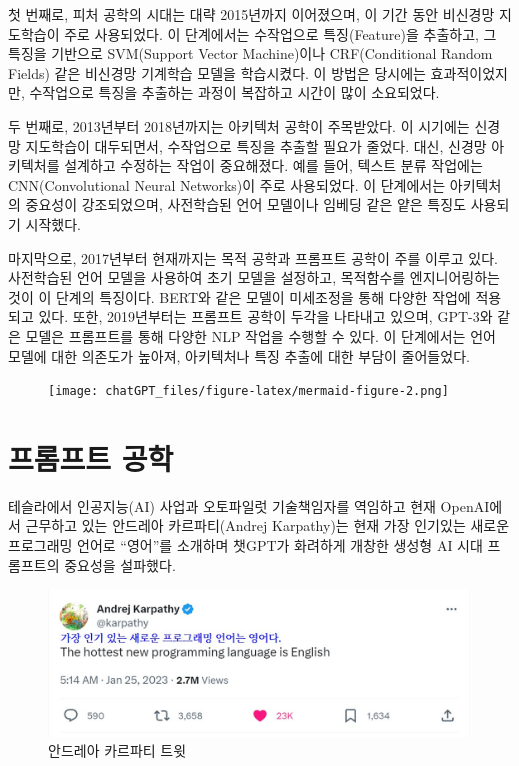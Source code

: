 \documentclass[
  letterpaper,
]{book}
\begin{document}
첫 번째로, 피처 공학의 시대는 대략 2015년까지 이어졌으며, 이 기간 동안
비신경망 지도학습이 주로 사용되었다. 이 단계에서는 수작업으로
특징(Feature)을 추출하고, 그 특징을 기반으로 SVM(Support Vector
Machine)이나 CRF(Conditional Random Fields) 같은 비신경망 기계학습
모델을 학습시켰다. 이 방법은 당시에는 효과적이었지만, 수작업으로 특징을
추출하는 과정이 복잡하고 시간이 많이 소요되었다.

두 번째로, 2013년부터 2018년까지는 아키텍처 공학이 주목받았다. 이
시기에는 신경망 지도학습이 대두되면서, 수작업으로 특징을 추출할 필요가
줄었다. 대신, 신경망 아키텍처를 설계하고 수정하는 작업이 중요해졌다.
예를 들어, 텍스트 분류 작업에는 CNN(Convolutional Neural Networks)이
주로 사용되었다. 이 단계에서는 아키텍처의 중요성이 강조되었으며,
사전학습된 언어 모델이나 임베딩 같은 얕은 특징도 사용되기 시작했다.

마지막으로, 2017년부터 현재까지는 목적 공학과 프롬프트 공학이 주를
이루고 있다. 사전학습된 언어 모델을 사용하여 초기 모델을 설정하고,
목적함수를 엔지니어링하는 것이 이 단계의 특징이다. BERT와 같은 모델이
미세조정을 통해 다양한 작업에 적용되고 있다. 또한, 2019년부터는 프롬프트
공학이 두각을 나타내고 있으며, GPT-3와 같은 모델은 프롬프트를 통해
다양한 NLP 작업을 수행할 수 있다. 이 단계에서는 언어 모델에 대한
의존도가 높아져, 아키텍처나 특징 추출에 대한 부담이 줄어들었다.
\autocite{Amatriain2023}

\begin{figure}[H]

{\centering \texttt{[image: chatGPT\_files/figure-latex/mermaid-figure-2.png]}

}

\end{figure}

\hypertarget{uxd504uxb86cuxd504uxd2b8-uxacf5uxd559}{%
\chapter{프롬프트 공학}\label{uxd504uxb86cuxd504uxd2b8-uxacf5uxd559}}

테슬라에서 인공지능(AI) 사업과 오토파일럿 기술책임자를 역임하고 현재
OpenAI에서 근무하고 있는 안드레아 카르파티(Andrej Karpathy)는 현재 가장
인기있는 새로운 프로그래밍 언어로 ``영어''를 소개하며 챗GPT가 화려하게
개창한 생성형 AI 시대 프롬프트의 중요성을 설파했다.

\begin{figure}

{\centering \includegraphics[width=10.45833in,height=\textheight]{images/andrej.jpg}

}

\caption{안드레아 카르파티 트윗}

\end{figure}
\end{document}
